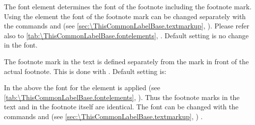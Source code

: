 \BeginIndexGroup
{}%
%
The%
 font element 
determines the font of the footnote including the footnote mark. Using the
element  the
font of the footnote mark can be changed separately with the commands
 and
 (see
\autoref{sec:\ThisCommonLabelBase.textmarkup},
). Please refer also to
\autoref{tab:\ThisCommonLabelBase.fontelements},
.
Default setting is no change in the font.%
%

%
%
The footnote mark in the text is defined separately from the mark in
front of the actual footnote. This is done with
. Default setting is:
\begin{lstcode}
\end{lstcode}
In the above%
 the font for the element
 is
applied (see \autoref{tab:\ThisCommonLabelBase.fontelements},
). Thus the footnote marks
in the text and in the footnote itself are identical. The font can be changed
with the commands  and
 (see
\autoref{sec:\ThisCommonLabelBase.textmarkup},
)%
.

